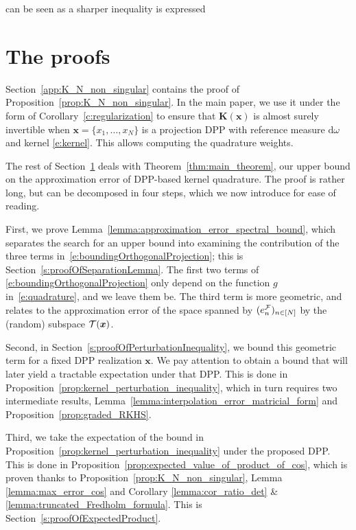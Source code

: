 \documentclass[twoside,11pt]{book}
\numberwithin{theorem}{chapter}
\numberwithin{definition}{chapter}
\numberwithin{proposition}{chapter}
\numberwithin{corollary}{chapter}
\numberwithin{example}{chapter}
\numberwithin{lemma}{chapter}
\begin{document}
can be seen as a sharper inequality is expressed 


\label{subsec:dpp_quadrature_error_strong}




\section{The proofs}
\label{s:proofs}
Section~\ref{app:K_N_non_singular} contains the proof of Proposition~\ref{prop:K_N_non_singular}. In the main paper, we use it under the form of Corollary~\ref{c:regularization} to ensure that $\bm{K}(\bm{x})$ is almost surely invertible when $\bm{x} = \{x_{1}, \dots , x_{N}\}$ is a projection DPP with reference measure $\mathrm{d}\omega$ and kernel \eqref{e:kernel}. This allows computing the quadrature weights.

The rest of Section~\ref{s:proofs} deals with Theorem~\ref{thm:main_theorem}, our upper bound on the approximation error of DPP-based kernel quadrature. The proof is rather long, but can be decomposed in four steps, which we now introduce for ease of reading.

First, we prove Lemma~\ref{lemma:approximation_error_spectral_bound}, which separates the search for an upper bound into examining the contribution of the three terms in~\eqref{e:boundingOrthogonalProjection}; this is Section~\ref{s:proofOfSeparationLemma}. The first two terms of \eqref{e:boundingOrthogonalProjection} only depend on the function $g$ in~\eqref{e:quadrature}, and we leave them be. The third term is more geometric, and relates to the approximation error of the space spanned by $(e^{\cal F}_n)_{n\in[N]}$ by the (random) subspace ${\cal T}(\bm{x})$.

Second, in Section~\ref{s:proofOfPerturbationInequality}, we bound this geometric term for a fixed DPP realization $\bm{x}$. We pay attention to obtain a bound that will later yield a tractable expectation under that DPP. This is done in Proposition~\ref{prop:kernel_perturbation_inequality}, which in turn requires two intermediate results, Lemma~\ref{lemma:interpolation_error_matricial_form} and Proposition~\ref{prop:graded_RKHS}.

Third, we take the expectation of the bound in Proposition~\ref{prop:kernel_perturbation_inequality} under the proposed DPP. This is done in Proposition~\ref{prop:expected_value_of_product_of_cos}, which is proven thanks to Proposition~\ref{prop:K_N_non_singular}, Lemma \ref{lemma:max_error_cos} and Corollary \ref{lemma:cor_ratio_det} \& \ref{lemma:truncated_Fredholm_formula}. This is Section~\ref{s:proofOfExpectedProduct}.
\end{document}
